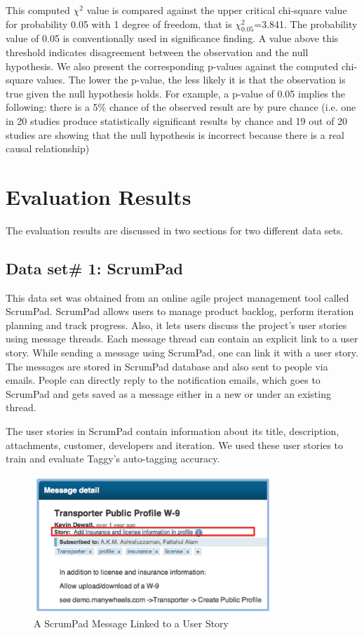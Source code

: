 This computed $\chi^{2}$ value is compared against the upper critical chi-square value for probability 0.05 with 1 degree of freedom, that is $\chi^{2}_{0.05}$=3.841. The probability value of 0.05 is conventionally used in significance finding. A value above this threshold indicates disagreement between the observation and the null hypothesis. We also present the corresponding p-values against the computed chi-square values. The lower the p-value, the less likely it is that the observation is true given the null hypothesis holds. For example, a p-value of 0.05 implies the following: there is a 5\% chance of the observed result are by pure chance (i.e. one in 20 studies produce statistically significant results by chance and 19 out of 20 studies are showing that the null hypothesis is incorrect because there is a real causal relationship)

\section{Evaluation Results}
The evaluation results are discussed in two sections for two different data sets.

\subsection{Data set\# 1: ScrumPad}	
This data set was obtained from an online agile project management tool called ScrumPad.	ScrumPad allows users to manage product backlog, perform iteration planning and track progress. Also, it lets users discuss the project's user stories using message threads. Each message thread can contain an explicit link to a user story. While sending a message using ScrumPad, one can link it with a user story. The messages are stored in ScrumPad database and also sent to people via emails. People can directly reply to the notification emails, which goes to ScrumPad and gets saved as a message either in a new or under an existing thread.

The user stories in ScrumPad contain information about its title, description, attachments, customer, developers and iteration. We used these user stories to train and evaluate Taggy's auto-tagging accuracy.

\begin{figure}[h!]
	\centering
	\includegraphics[width=0.8\textwidth]{scrumpad_message.png}
   \caption{A ScrumPad Message Linked to a User Story}
	\label{fig:scrumpad_message}
\end{figure}

